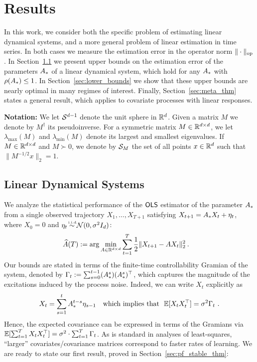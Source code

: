 \section{Results}
\label{sec:results}

    In this work, we consider both the specific problem of estimating linear dynamical systems, and a more general problem of linear estimation in time series.
    In both cases we measure the estimation error in the operator norm $\|\cdot\|_{\mathrm{op}}$.
    In Section~\ref{sec:linear_systems} we present upper bounds on the estimation error of the 
parameters $A_{*}$ of a linear dynamical system, which hold for any $A_{*}$ with $\rho(A_{*}) \leq 1$.
%
In Section~\ref{sec:lower_bounds} we show that these upper bounds are
nearly optimal in many regimes of interest.
%
Finally, Section~\ref{sec:meta_thm} states a general result,
which applies to covariate processes with linear responses. 

\textbf{Notation:} We let $\mathcal{S}^{d-1}$ denote the unit sphere in $\mathbb{R}^d$. Given a matrix $M$ we denote by $M^\dagger$ its pseudoinverse. For a symmetric matrix $M \in \mathbb{R}^{d\times d}$, we let $\lambda_{\max}(M)$ and $\lambda_{\min}(M)$ denote its largest and smallest eigenvalues. If $M \in \mathbb{R}^{d \times d}$ and $M \succ 0$, we denote by $\mathcal{S}_M$ the set of all points $x\in \mathbb{R}^d$ such that $\|M^{-1/2}x\|_2 = 1$.  


\subsection{Linear Dynamical Systems}
\label{sec:linear_systems}

We analyze the statistical performance of the $\mathsf{OLS }$ estimator of the parameter $A_{*}$
    from a single observed trajectory $X_1, \ldots, X_{T+1}$ satisfying $X_{t + 1} = A_{*} X_t + \eta_t$, where $X_0 = 0$ and $\noise_t \iid \calN(0, \sigma^2 I_d)$:
    \begin{align}
    \widehat{A}(T) &:= \arg\min_{A \in \mathbb{R}^{d \times d}} \sum_{t=1}^T \frac{1}{2}\|X_{t + 1} - A X_t\|_2^2 \:.
    \end{align}
%
Our bounds are stated in terms of the finite-time controllability Gramian of the system, denoted by $\Gamma_t := \sum_{s=0}^{t-1} (A_{*}^{s})(A_{*}^s)^{\top}$, which captures the magnitude of the excitations induced by the process noise. Indeed, we can write $X_t$ explicitly as
\begin{eqnarray}\label{eq:recursion_eq}
X_{t} = \sum_{s=1}^{t} A_{*}^{t-s}\eta_{s-1}~~\text{ which implies that}~~\mathbb{E}[X_tX_t^{\top}] = \sigma^2\Gamma_t~.
\end{eqnarray}
Hence, the expected covariance can be expressed in terms of the Gramians via $\mathbb{E}[\sum_{t=1}^T X_tX_t^\top] = \sigma^2\cdot \sum_{t=1}^T \Gamma_t$. As is standard in analyses of least-squares, ``larger'' covariates/covariance matrices correspond to faster rates of learning.
We are ready to state our first result, proved in Section~\ref{sec:pf_stable_thm}:

